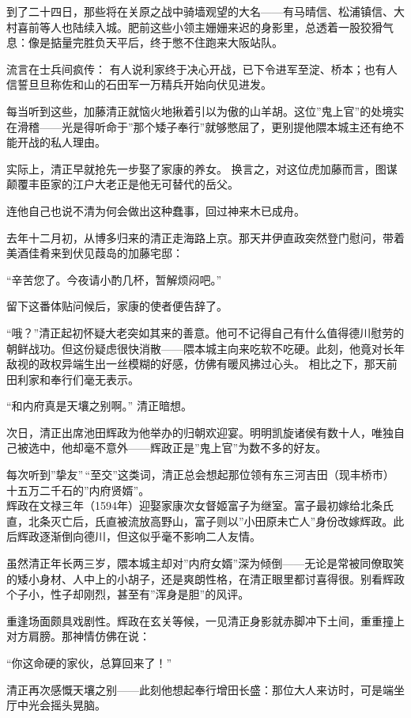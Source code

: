 \documentclass[
]{book}
\begin{document}
到了二十四日，那些将在关原之战中骑墙观望的大名------有马晴信、松浦镇信、大村喜前等人也陆续入城。肥前这些小领主姗姗来迟的身影里，总透着一股狡猾气息：像是掂量完胜负天平后，终于憋不住跑来大阪站队。

流言在士兵间疯传： 有人说利家终于决心开战，已下令进军至淀、桥本；也有人信誓旦旦称佐和山的石田军一万精兵开始向伏见进发。

每当听到这些，加藤清正就恼火地揪着引以为傲的山羊胡。这位''鬼上官''的处境实在滑稽------光是得听命于''那个矮子奉行''就够憋屈了，更别提他隈本城主还有绝不能开战的私人理由。

实际上，清正早就抢先一步娶了家康的养女。 换言之，对这位虎加藤而言，图谋颠覆丰臣家的江户大老正是他无可替代的岳父。

连他自己也说不清为何会做出这种蠢事，回过神来木已成舟。

去年十二月初，从博多归来的清正走海路上京。那天井伊直政突然登门慰问，带着美酒佳肴来到伏见葭岛的加藤宅邸：

``辛苦您了。今夜请小酌几杯，暂解烦闷吧。''

留下这番体贴问候后，家康的使者便告辞了。

``哦？''清正起初怀疑大老突如其来的善意。他可不记得自己有什么值得德川慰劳的朝鲜战功。但这份疑虑很快消散------隈本城主向来吃软不吃硬。此刻，他竟对长年敌视的政权异端生出一丝模糊的好感，仿佛有暖风拂过心头。 相比之下，那天前田利家和奉行们毫无表示。

``和内府真是天壤之别啊。'' 清正暗想。

次日，清正出席池田辉政为他举办的归朝欢迎宴。明明凯旋诸侯有数十人，唯独自己被选中，他却毫不意外------辉政正是''鬼上官''为数不多的好友。

每次听到''挚友''\,``至交''这类词，清正总会想起那位领有东三河吉田（现丰桥市）十五万二千石的''内府贤婿''。\\

辉政在文禄三年（1594年）迎娶家康次女督姬富子为继室。富子最初嫁给北条氏直，北条灭亡后，氏直被流放高野山，富子则以''小田原未亡人''身份改嫁辉政。此后辉政逐渐倒向德川，但这似乎毫不影响二人友情。

虽然清正年长两三岁，隈本城主却对''内府女婿''深为倾倒------无论是常被同僚取笑的矮小身材、人中上的小胡子，还是爽朗性格，在清正眼里都讨喜得很。别看辉政个子小，性子却刚烈，甚至有''浑身是胆''的风评。

重逢场面颇具戏剧性。辉政在玄关等候，一见清正身影就赤脚冲下土间，重重撞上对方肩膀。那神情仿佛在说：

``你这命硬的家伙，总算回来了！''

清正再次感慨天壤之别------此刻他想起奉行增田长盛：那位大人来访时，可是端坐厅中光会摇头晃脑。
\end{document}
